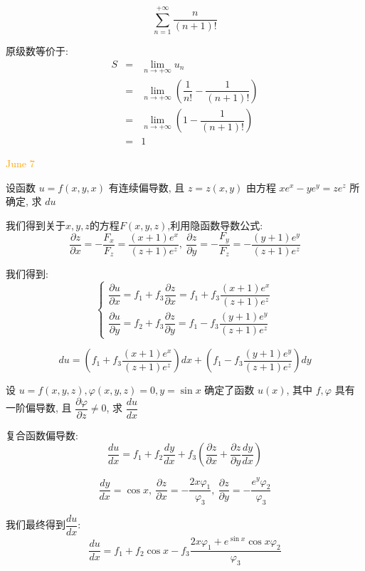 \begin{example}[][Exam: 32.1.11]
	$$\sum\limits_{n=1}^{+\infty}\dfrac{n}{(n+1)!}$$
\end{example}

\begin{solution}
	
	原级数等价于: 
	\begin{eqnarray*}
		S&=&\lim\limits_{n\to+\infty}u_{n}\\
		&=&\lim\limits_{n\to+\infty}(\dfrac{1}{n!}-\dfrac{1}{(n+1)!})\\
		&=&\lim\limits_{n\to+\infty}(1-\dfrac{1}{(n+1)!})\\
		&=&1	
	\end{eqnarray*}
\end{solution}


\textcolor{orange}{June 7}

\begin{example}[][Exam: 32.1.12]
	设函数 $u=f(x,y,x)$ 有连续偏导数, 且 $z=z(x,y)$ 由方程 $xe^x-ye^y=ze^z$ 所确定, 求 $du$
\end{example}

\begin{solution}
	
	我们得到关于$x,y,z$的方程$F(x,y,z)$,利用隐函数导数公式: 
	$$\dfrac{\partial z}{\partial x}=-\dfrac{F_{x}}{F_{z}}=\dfrac{(x+1)e^x}{(z+1)e^z},\ \dfrac{\partial z}{\partial y}=-\dfrac{F_{y}}{F_{z}}=-\dfrac{(y+1)e^y}{(z+1)e^z}$$
	
	我们得到: 
	$$\left\lbrace 
	\begin{array}{l}
		\dfrac{\partial u}{\partial x}=f_{1}+f_{3}\dfrac{\partial z}{\partial x}=f_{1}+f_{3}\dfrac{(x+1)e^x}{(z+1)e^z}\\
		\dfrac{\partial u}{\partial y}=f_{2}+f_{3}\dfrac{\partial z}{\partial y}=f_{1}-f_{3}\dfrac{(y+1)e^y}{(z+1)e^z}
	\end{array}
	\right. $$
	
	$$du=(f_{1}+f_{3}\dfrac{(x+1)e^x}{(z+1)e^z})dx+(f_{1}-f_{3}\dfrac{(y+1)e^y}{(z+1)e^z})dy$$
\end{solution}

\begin{example}[][Exam: 32.1.13]
	设 $u=f(x,y,z), \varphi(x,y,z)=0, y=\sin x$ 确定了函数 $u(x)$, 其中 $f,\varphi$ 具有一阶偏导数, 
	且 $\dfrac{\partial \varphi}{\partial z}\neq 0$, 求 $\dfrac{du}{dx}$
\end{example}

\begin{solution}
	
	复合函数偏导数: 
	$$\dfrac{du}{dx}=f_{1}+f_{2}\dfrac{dy}{dx}+f_{3}(\dfrac{\partial z}{\partial x}+\dfrac{\partial z}{\partial y}\dfrac{dy}{dx})$$
	
	$$\dfrac{dy}{dx}=\cos x,\ \dfrac{\partial z}{\partial x}=-\dfrac{2x\varphi_{1}}{\varphi_{3}},\ \dfrac{\partial z}{\partial y}=-\dfrac{e^y\varphi_{2}}{\varphi_{3}}$$
	
	我们最终得到$\dfrac{du}{dx}$: 
	$$\dfrac{du}{dx}=f_{1}+f_{2}\cos x-f_{3}\dfrac{2x\varphi_{1}+e^{\sin x}\cos x \varphi_{2}}{\varphi_{3}}$$
\end{solution}


